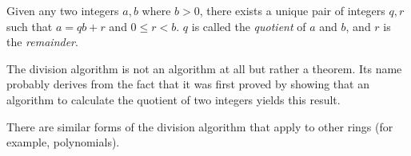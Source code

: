 \documentclass{article}
\begin{document}
Given any two integers $a,b$ where $b > 0$, there exists a unique pair of integers $q,r$ such that $a = qb + r$ and $0 \leq r < b$.  $q$ is called the \emph{quotient} of $a$ and $b$, and $r$ is the \emph{remainder}.

The division algorithm is not an algorithm at all but rather a theorem.  Its name probably derives from the fact that it was first proved by showing that an algorithm to calculate the quotient of two integers yields this result.

There are similar forms of the division algorithm that apply to other rings (for example, polynomials).
\end{document}
